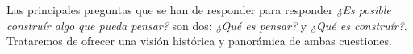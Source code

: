 \documentclass[12pt]{memoir}
\begin{document}
Las principales preguntas que se han de responder para responder \textit{¿Es posible construír algo que pueda pensar?} son dos: \textit{¿Qué es pensar?} y \textit{¿Qué es construír?}. Trataremos de ofrecer una visión histórica y panorámica de ambas cuestiones.

\newpage

\printbibliography
\end{document}
